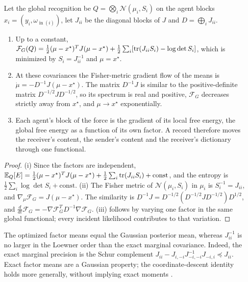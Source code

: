 \documentclass[11pt,letterpaper]{report}
\newcommand{\inn}{\operatorname{in}}
\begin{document}
Let the global recognition be $Q=\bigotimes_i\mathcal N(\mu_i,S_i)$ on the agent blocks $x_i=(y_i,\omega_{\inn(i)})$, let $J_{ii}$ be the diagonal blocks of $J$ and $D=\bigoplus_iJ_{ii}$.
\begin{enumerate}
\item[(i)] Up to a constant, $\mathcal F_G(Q)=\frac12(\mu-x^\star)^TJ(\mu-x^\star)+\frac12\sum_i[\operatorname{tr}(J_{ii}S_i)-\log\det S_i]$, which is minimized by $S_i=J_{ii}^{-1}$ and $\mu=x^\star$.
\item[(ii)] At these covariances the Fisher-metric gradient flow of the means is $\dot\mu=-D^{-1}J(\mu-x^\star)$. The matrix $D^{-1}J$ is similar to the positive-definite matrix $D^{-1/2}JD^{-1/2}$, so its spectrum is real and positive, $\mathcal F_G$ decreases strictly away from $x^\star$, and $\mu\to x^\star$ exponentially.
\item[(iii)] Each agent's block of the force is the gradient of its local free energy, the global free energy as a function of its own factor. A record therefore moves the receiver's content, the sender's content and the receiver's dictionary through one functional.
\end{enumerate}
\begin{proof}
(i) Since the factors are independent, $\mathbb E_Q[E]=\frac12(\mu-x^\star)^TJ(\mu-x^\star)+\frac12\sum_i\operatorname{tr}(J_{ii}S_i)+\mathrm{const}$, and the entropy is $\frac12\sum_i\log\det S_i+\mathrm{const}$. (ii) The Fisher metric of $\mathcal N(\mu_i,S_i)$ in $\mu_i$ is $S_i^{-1}=J_{ii}$, and $\nabla_\mu\mathcal F_G=J(\mu-x^\star)$. The similarity is $D^{-1}J=D^{-1/2}(D^{-1/2}JD^{-1/2})D^{1/2}$, and $\frac d{dt}\mathcal F_G=-\nabla\mathcal F_G^TD^{-1}\nabla\mathcal F_G$. (iii) follows by varying one factor in the same global functional; every incident likelihood contributes to that variation.
\end{proof}

The optimized factor means equal the Gaussian posterior mean, whereas $J_{ii}^{-1}$ is no larger in the Loewner order than the exact marginal covariance. Indeed, the exact marginal precision is the Schur complement $J_{ii}-J_{i,-i}J_{-i,-i}^{-1}J_{-i,i}\preceq J_{ii}$. Exact factor means are a Gaussian property; the coordinate-descent identity holds more generally, without implying exact moments \citep{Bishop2006}.
\end{document}

